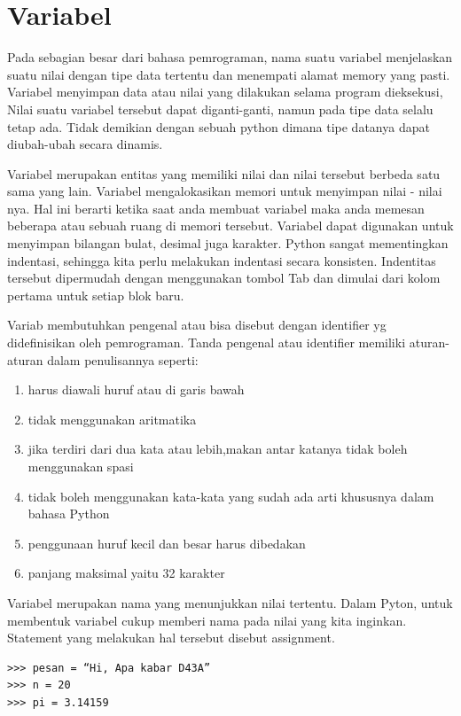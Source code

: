 
\section{Variabel}
Pada sebagian besar dari bahasa pemrograman, nama suatu variabel
menjelaskan suatu nilai dengan tipe data tertentu 
dan menempati alamat memory yang pasti.
Variabel menyimpan data atau nilai yang dilakukan selama program dieksekusi,
Nilai suatu variabel tersebut dapat diganti-ganti, namun pada tipe data selalu tetap ada.
Tidak demikian dengan sebuah python dimana tipe datanya dapat diubah-ubah
secara dinamis\cite{suparno2013komputasi}.

Variabel merupakan entitas yang memiliki nilai dan nilai tersebut berbeda satu sama yang lain. Variabel mengalokasikan memori untuk menyimpan nilai - nilai nya.
Hal ini berarti ketika saat anda membuat variabel maka anda memesan beberapa atau sebuah ruang di memori tersebut. 
Variabel dapat digunakan untuk menyimpan bilangan bulat, desimal juga karakter.
Python sangat mementingkan indentasi, sehingga kita perlu melakukan indentasi secara konsisten. 
Indentitas tersebut dipermudah dengan menggunakan tombol Tab dan dimulai dari kolom pertama untuk setiap blok baru.

Variab membutuhkan pengenal atau bisa disebut dengan identifier yg didefinisikan oleh pemrograman. Tanda pengenal atau identifier memiliki aturan-aturan dalam penulisannya seperti:
\begin{enumerate}
\item
harus diawali huruf atau di garis bawah
\item
tidak menggunakan aritmatika
\item
jika terdiri dari dua kata atau lebih,makan antar katanya tidak boleh menggunakan spasi
\item
tidak boleh menggunakan kata-kata yang sudah ada arti khususnya dalam bahasa Python
\item
penggunaan huruf kecil dan besar harus dibedakan
\item
panjang maksimal yaitu 32 karakter
\end{enumerate}

Variabel merupakan nama yang menunjukkan nilai tertentu. Dalam Pyton, untuk membentuk variabel cukup memberi nama pada nilai yang kita inginkan. Statement yang melakukan hal tersebut disebut assignment.
\begin{verbatim}
>>> pesan = “Hi, Apa kabar D43A”
>>> n = 20
>>> pi = 3.14159
\end{verbatim}

